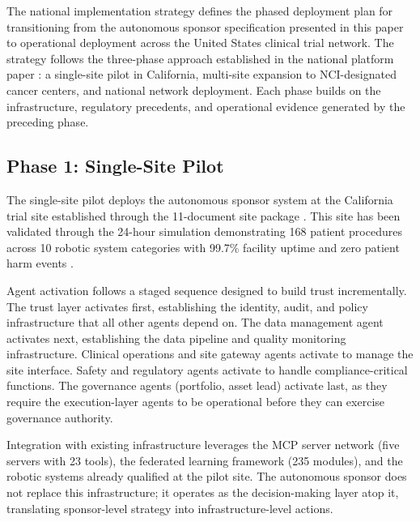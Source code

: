 
The national implementation strategy defines the phased deployment plan for transitioning
from the autonomous sponsor specification presented in this paper to operational deployment
across the United States clinical trial network. The strategy follows the three-phase
approach established in the national platform paper \cite{national-platform-paper}: a
single-site pilot in California, multi-site expansion to NCI-designated cancer centers, and
national network deployment. Each phase builds on the infrastructure, regulatory precedents,
and operational evidence generated by the preceding phase.

\subsection{Phase 1: Single-Site Pilot}

The single-site pilot deploys the autonomous sponsor system at the California trial site
established through the 11-document site package \cite{site-docs}. This site has been
validated through the 24-hour simulation demonstrating 168 patient procedures across 10
robotic system categories with 99.7\% facility uptime and zero patient harm events
\cite{main-repo}.

Agent activation follows a staged sequence designed to build trust incrementally. The
trust layer activates first, establishing the identity, audit, and policy infrastructure
that all other agents depend on. The data management agent activates next, establishing
the data pipeline and quality monitoring infrastructure. Clinical operations and site
gateway agents activate to manage the site interface. Safety and regulatory agents activate
to handle compliance-critical functions. The governance agents (portfolio, asset lead)
activate last, as they require the execution-layer agents to be operational before they
can exercise governance authority.

Integration with existing infrastructure leverages the MCP server network \cite{mcp-repo}
(five servers with 23 tools), the federated learning framework \cite{fl-repo} (235 modules),
and the robotic systems already qualified at the pilot site. The autonomous sponsor does not
replace this infrastructure; it operates as the decision-making layer atop it, translating
sponsor-level strategy into infrastructure-level actions.

